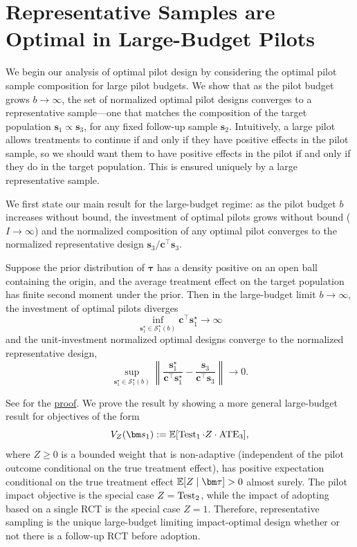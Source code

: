 \section{Representative Samples are Optimal in Large-Budget Pilots}
\label{sec:large-budget}

We begin our analysis of optimal pilot design by considering the optimal pilot sample composition for large pilot budgets.
We show that as the pilot budget grows $b\to\infty$, the set of normalized optimal pilot designs converges to a representative sample---one that matches the composition of the target population $\bm{s}_1 \propto \bm{s}_3$, for any fixed follow-up sample $\bm{s}_2$.
Intuitively, a large pilot allows treatments to continue if and only if they have positive effects in the pilot sample, so we should want them to have positive effects in the pilot if and only if they do in the target population.
This is ensured uniquely by a large representative sample.

We first state our main result for the large-budget regime: as the pilot budget $b$ increases without bound, the investment of optimal pilots grows without bound ($I\to\infty$) and the normalized composition of any optimal pilot converges to the normalized representative design $\bm{s}_3 / \bm{c}^\top \bm{s}_3$.
\begin{theorem}
  \label{thm:large-budget-limiting-optimal-policy}
  Suppose the prior distribution of $\bm\tau$ has a density positive on an open ball containing the origin, and the average treatment effect on the target population has finite second moment under the prior.
  Then in the large-budget limit $b\to\infty$, the investment of optimal pilots diverges
  \[
    \inf_{\bm s_1^\star\in\mathcal{S}_1^{\star}(b)} \bm
    c^\top \bm s_1^\star
    \to \infty
  \]
  and the unit-investment normalized optimal designs converge to the normalized representative design,
  \[
    \sup_{\bm s_1^\star\in\mathcal{S}_1^{\star}(b)}
    \left\|
    \frac{\bm s_1^\star}{\bm c^\top \bm
    s_1^\star}-\frac{\bm s_3}{\bm c^\top \bm s_3}
    \right\|
    \to 0.
  \]
\end{theorem}

See  for the
\hyperref[thm:large-budget-limiting-optimal-policy-appendix]{proof}.
We prove the result by showing a more general large-budget result for objectives of the form
\[
  V_Z(\bm s_1)\defeq \E[\Test_1 \cdot Z\cdot \ATE_3],
\]
where $Z\geq 0$ is a bounded weight that is non-adaptive (independent of the pilot outcome conditional on the true treatment effect), has positive expectation conditional on the true treatment effect $\E[Z\mid\bm\tau]>0$ almost surely.
The pilot impact objective is the special case $Z=\operatorname{Test}_2$, while the impact of adopting based on a single RCT is the special case $Z=1$.
Therefore, representative sampling is the unique large-budget limiting impact-optimal design whether or not there is a follow-up RCT before adoption.

